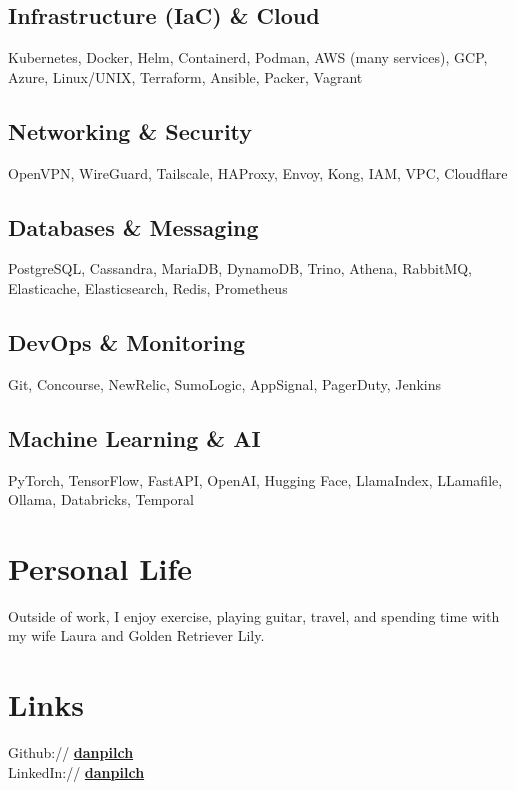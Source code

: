 \documentclass[]{resume}
\begin{document}
\begin{minipage}[t]{0.33\textwidth}
\subsection{Infrastructure (IaC) \& Cloud}
Kubernetes, Docker, Helm, Containerd, Podman, AWS (many services), GCP, Azure, Linux/UNIX, Terraform, Ansible, Packer, Vagrant
\sectionsep

\subsection{Networking \& Security}
OpenVPN, WireGuard, Tailscale, HAProxy, Envoy, Kong, IAM, VPC, Cloudflare
\sectionsep

\subsection{Databases \& Messaging}
PostgreSQL, Cassandra, MariaDB, DynamoDB, Trino, Athena, RabbitMQ, Elasticache, Elasticsearch, Redis, Prometheus
\sectionsep

\subsection{DevOps \& Monitoring}
Git, Concourse, NewRelic, SumoLogic, AppSignal, PagerDuty, Jenkins
\sectionsep

\subsection{Machine Learning \& AI}
PyTorch, TensorFlow, FastAPI, OpenAI, Hugging Face, LlamaIndex, LLamafile, Ollama, Databricks, Temporal
\sectionsep


\section{Personal Life}
Outside of work, I enjoy exercise, playing guitar, travel, and spending time with my wife Laura and Golden Retriever Lily.
\sectionsep


\section{Links}
Github:// \href{https://github.com/danpilch}{\bf danpilch} \\
LinkedIn://  \href{https://www.linkedin.com/in/danpilch}{\bf danpilch}
\sectionsep

\end{minipage}
\end{document}
